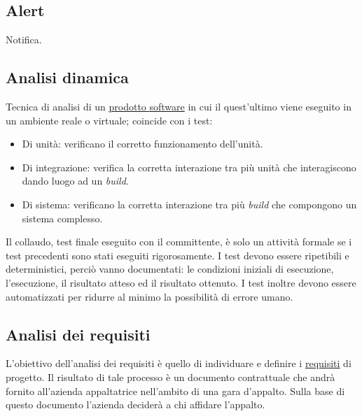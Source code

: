 





\copertina


\tableofcontents


	\newpage	


	\subsection{Alert}
	\label{sec:alter}
	Notifica.


	\subsection{Analisi dinamica}
	\label{sec:analisidinamica}
	Tecnica di analisi di un \underline{\hyperref[sec:prodottosoftware]prodotto {software}} in cui il quest'ultimo viene eseguito in un ambiente reale o virtuale; coincide con i test:
	\begin{itemize}
		\item Di unità: verificano il corretto funzionamento dell'unità.
		\item Di integrazione: verifica la corretta interazione tra più unità che interagiscono dando luogo ad un \emph{build}.
		\item Di sistema: verificano la corretta interazione tra più \emph{build} che compongono un sistema complesso.
	\end{itemize}
	Il collaudo, test finale eseguito con il committente, è solo un attività formale se i test precedenti sono stati eseguiti rigorosamente. I test devono essere ripetibili e deterministici, perciò vanno documentati: le condizioni iniziali di esecuzione, l'esecuzione, il risultato atteso ed il risultato ottenuto. I test inoltre devono essere automatizzati per ridurre al minimo la possibilità di errore umano.


	\subsection{Analisi dei requisiti}
	\label{sec:analisirequisiti}
	L'obiettivo dell'analisi dei requisiti è quello di individuare e definire i \underline{\hyperref[sec:requisito]{requisiti}} di progetto. Il risultato di tale processo è un documento contrattuale che andrà fornito all'azienda appaltatrice nell'ambito di una gara d'appalto. Sulla base di questo documento l'azienda deciderà a chi affidare l'appalto.


